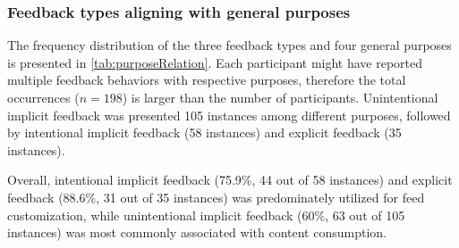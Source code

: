 \subsubsection{Feedback types aligning with general purposes} 
The frequency distribution of the three feedback types and four general purposes is presented in \autoref{tab:purposeRelation}. Each participant might have reported multiple feedback behaviors with respective purposes, therefore the total occurrences ($n = 198$) is larger than the number of participants. Unintentional implicit feedback was presented 105 instances among different purposes, followed by intentional implicit feedback (58 instances) and explicit feedback (35 instances).

\begin{table*}[]
\caption{The frequencies of each feedback type---unintentional implicit feedback, intentional implicit feedback, and explicit feedback---across user purposes, including content creation and promotion, feed customization, content consumption, and directed information seeking.}
\label{tab:purposeRelation}
\centering
{}
\end{table*}

Overall, intentional implicit feedback (75.9\%, 44 out of 58 instances) and explicit feedback (88.6\%, 31 out of 35 instances) was predominately utilized for feed customization, while unintentional implicit feedback (60\%, 63 out of 105 instances) was most commonly associated with content consumption.

